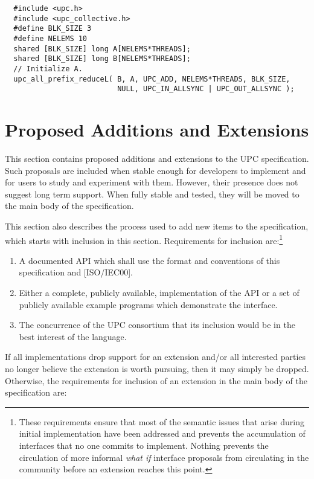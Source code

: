 \documentclass[12pt,titlepage]{article}
\newcounter{parnum}
\newcommand\np{\addtocounter{parnum}{1}\hspace{-2em}\makebox[2em][l]{\arabic{parnum}}}
\begin{document}
\begin{verbatim}
  #include <upc.h>
  #include <upc_collective.h>
  #define BLK_SIZE 3
  #define NELEMS 10
  shared [BLK_SIZE] long A[NELEMS*THREADS];
  shared [BLK_SIZE] long B[NELEMS*THREADS];
  // Initialize A.
  upc_all_prefix_reduceL( B, A, UPC_ADD, NELEMS*THREADS, BLK_SIZE,
                          NULL, UPC_IN_ALLSYNC | UPC_OUT_ALLSYNC );
\end{verbatim}

\pagebreak
\appendix
\section{Proposed Additions and Extensions}

\np This section contains proposed additions and extensions to the UPC
     specification.  Such proposals are included when stable enough for
     developers to implement and for users to study and experiment with them.
     However, their presence does not suggest long term support.  When fully
     stable and tested, they will be moved to the main body of the specification.

\np This section also describes the process used to add new items to the 
    specification, which starts with inclusion in this section.  Requirements
    for inclusion are:\footnote{These requirements ensure that most of the
    semantic issues that arise during initial implementation have been addressed
    and prevents the accumulation of interfaces that no one commits to
    implement. Nothing prevents the circulation of more informal {\em what if} 
    interface proposals from circulating in the community before an extension
    reaches this point.} 

\begin{enumerate}
\item A documented API which shall use the format and conventions of
    this specification and [ISO/IEC00].

\item Either a complete, publicly available, implementation of the API
    or a set of publicly available example programs which demonstrate
    the interface.
    
\item The concurrence of the UPC consortium that its inclusion would be
    in the best interest of the language.    
\end{enumerate}

\np If all implementations drop support for an extension and/or all interested parties
    no longer believe the extension is worth pursuing, then it may simply be dropped.
    Otherwise, the requirements for inclusion of an extension in the main body of the
    specification are:
\end{document}
